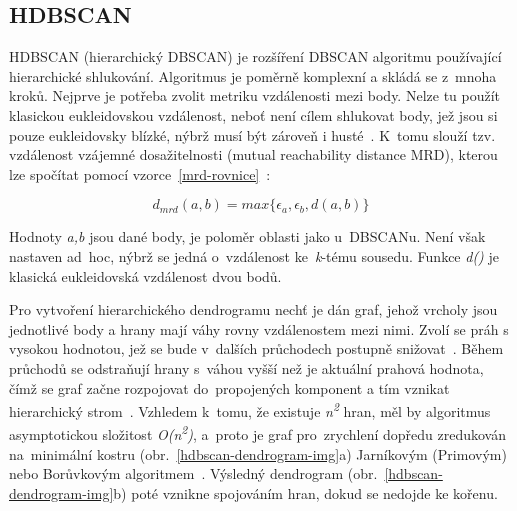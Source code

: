 \subsection{HDBSCAN}
HDBSCAN (hierarchický DBSCAN) je rozšíření DBSCAN algoritmu používající hierarchické shlukování. Algoritmus je poměrně komplexní a skládá se z~mnoha kroků. Nejprve je potřeba zvolit metriku vzdálenosti mezi body. Nelze tu použít klasickou eukleidovskou vzdálenost, neboť není cílem shlukovat body, jež jsou si pouze eukleidovsky blízké, nýbrž musí být zároveň i husté~\cite{hdbscan-video}. K~tomu slouží tzv. vzdálenost vzájemné dosažitelnosti (mutual reachability distance MRD), kterou lze spočítat pomocí vzorce~\ref{mrd-rovnice}~\cite{hdbscan}:

\begin{equation}
\label{mrd-rovnice}
d_{mrd}(a,b) = max\{\epsilon_a, \epsilon_b, d(a,b)\}
\end{equation}

Hodnoty \emph{a,b} jsou dané body, \textepsilon\space je poloměr oblasti jako u~DBSCANu. Není však nastaven ad~hoc, nýbrž se jedná o~vzdálenost ke~\emph{k}-tému sousedu. Funkce \emph{d()} je klasická eukleidovská vzdálenost dvou bodů.

Pro vytvoření hierarchického dendrogramu nechť je dán graf, jehož vrcholy jsou jednotlivé body a hrany mají váhy rovny vzdálenostem mezi nimi. Zvolí se práh s vysokou hodnotou, jež se bude v~dalších průchodech postupně snižovat~\cite{hdbscan}. Během průchodů se odstraňují hrany s~váhou vyšší než je aktuální prahová hodnota, čímž se graf začne rozpojovat do~propojených komponent a tím vznikat hierarchický strom~\cite{hdbscan}. Vzhledem k~tomu, že existuje \emph{n\textsuperscript{2}} hran, měl by algoritmus asymptotickou složitost \emph{O(n\textsuperscript{2})}, a~proto je graf pro~zrychlení dopředu zredukován na~minimální kostru (obr.~\ref{hdbscan-dendrogram-img}a) Jarníkovým (Primovým) nebo Borůvkovým algoritmem~\cite{hdbscan}. Výsledný dendrogram (obr.~\ref{hdbscan-dendrogram-img}b) poté vznikne spojováním hran, dokud se nedojde ke kořenu.

